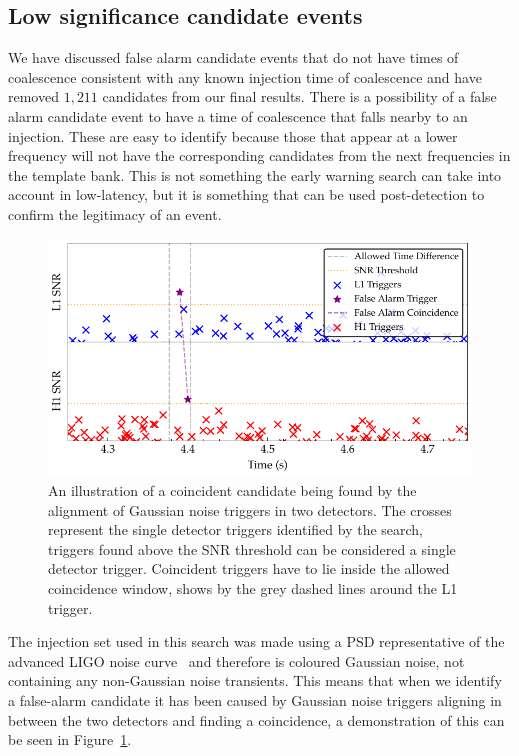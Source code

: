 \subsection{\label{6:sec:false-alarms}Low significance candidate events}

We have discussed false alarm candidate events that do not have times of coalescence consistent with any known injection time of coalescence and have removed $1,211$ candidates from our final results. There is a possibility of a false alarm candidate event to have a time of coalescence that falls nearby to an injection. These are easy to identify because those that appear at a lower frequency will not have the corresponding candidates from the next frequencies in the template bank. This is not something the early warning search can take into account in low-latency, but it is something that can be used post-detection to confirm the legitimacy of an event.
%
\begin{figure}
       \centering
    \includegraphics[width=\textwidth]{images/6_earlywarning/identified-problems/low_sig_cands.pdf}
    \caption{An illustration of a coincident candidate being found by the alignment of Gaussian noise triggers in two detectors. The crosses represent the single detector triggers identified by the \gwadj search, triggers found above the SNR threshold can be considered a single detector trigger. Coincident triggers have to lie inside the allowed coincidence window, shows by the grey dashed lines around the L1 trigger.}
    \label{6:fig:low_significance_candidates}
\end{figure}
%
The injection set used in this search was made using a PSD representative of the advanced LIGO noise curve~\cite{aLIGO_design_curve:2018} and therefore is coloured Gaussian noise, not containing any non-Gaussian noise transients. This means that when we identify a false-alarm candidate it has been caused by Gaussian noise triggers aligning in between the two detectors and finding a coincidence, a demonstration of this can be seen in Figure~\ref{6:fig:low_significance_candidates}.

